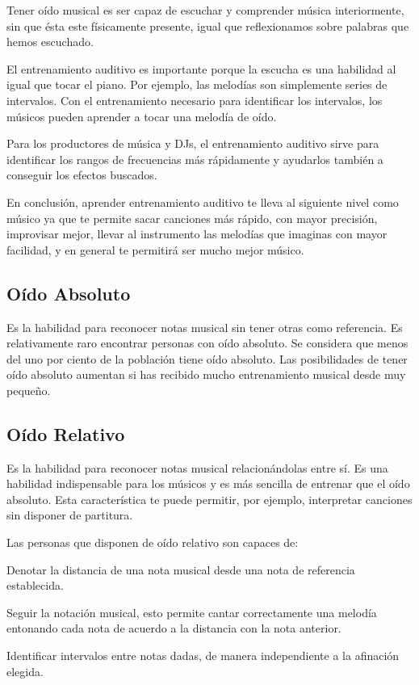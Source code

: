 \documentclass[12pt,twoside,titlepage]{report}
\begin{document}
Tener oído musical es ser capaz de escuchar y comprender música interiormente, sin que ésta este físicamente presente, igual que reflexionamos sobre palabras que hemos escuchado.

El entrenamiento auditivo es importante porque la escucha es una habilidad al igual que tocar el piano. Por ejemplo, las melodías son simplemente series de intervalos. Con el entrenamiento necesario para identificar los intervalos, los músicos pueden aprender a tocar una melodía de oído.

Para los productores de música y DJs, el entrenamiento auditivo sirve para identificar los rangos de frecuencias más rápidamente y ayudarlos también a conseguir los efectos buscados.

En conclusión, aprender entrenamiento auditivo te lleva al siguiente nivel como músico ya que te permite sacar canciones más rápido, con mayor precisión, improvisar mejor, llevar al instrumento las melodías que imaginas con mayor facilidad, y en general te permitirá ser mucho mejor músico.

\subsection{Oído Absoluto}

Es la habilidad para reconocer notas musical sin tener otras como referencia. Es relativamente raro encontrar personas con oído absoluto. Se considera que menos del uno por ciento de la población tiene oído absoluto. Las posibilidades de tener oído absoluto aumentan si has recibido mucho entrenamiento musical desde muy pequeño.

\subsection{Oído Relativo}

Es la habilidad para reconocer notas musical relacionándolas entre sí. Es una habilidad indispensable para los músicos y es más sencilla de entrenar que el oído absoluto. Esta característica te puede permitir, por ejemplo, interpretar canciones sin disponer de partitura.

Las personas que disponen de oído relativo son capaces de:
\begin{compactitem}
    \item Denotar la distancia de una nota musical desde una nota de referencia establecida.
    \item Seguir la notación musical, esto permite cantar correctamente una melodía entonando cada nota de acuerdo a la distancia con la nota anterior.
    \item Identificar intervalos entre notas dadas, de manera independiente a la afinación elegida.
\end{compactitem}
\end{document}
